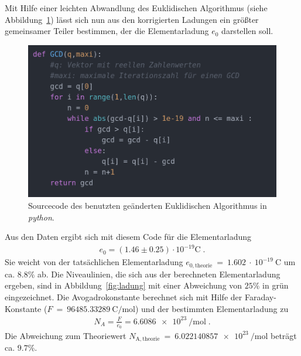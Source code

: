 Mit Hilfe einer leichten Abwandlung des Euklidischen Algorithmus (siehe Abbildung~\ref{fig:eukl}) lässt sich nun aus den korrigierten Ladungen ein größter gemeinsamer Teiler bestimmen, der die Elementarladung $e_0$ darstellen soll.

\begin{figure}
  \centering
  \includegraphics[width=0.5\textheight]{../figures/GCD.png}
  \caption{Sourcecode des benutzten geänderten Euklidischen Algorithmus in \emph{python}.}
\label{fig:eukl}
\end{figure}

Aus den Daten ergibt sich mit diesem Code für die Elementarladung
\begin{align}
  e_0 = (1.46 \pm 0.25)\cdot 10^{-19} \si{\coulomb} \; .
\end{align}
Sie weicht von der tatsächlichen Elementarladung $e_{0,\mathrm{theorie}}~=~1.602~\cdot~10^{-19}~\si{\coulomb}$  um ca. $8.8\%$ ab. Die Niveaulinien, die sich aus der berechneten Elementarladung ergeben, sind in Abbildung~\ref{fig:ladung} mit einer Abweichung von $25\%$ in grün eingezeichnet.
Die Avogadrokonstante berechnet sich mit Hilfe der Faraday-Konstante ($F~=~\SI{96485.33289}{\coulomb\per\mol}$) und der bestimmten Elementarladung zu
\begin{align}
  N_A = \frac{F}{e_0} = \SI{6.6086e+23}{\per\mol} \; .
\end{align}
Die Abweichung zum Theoriewert $N_{\mathrm{A,theorie}}~=~\SI{6.022140857e+23}{\per\mol}$ beträgt ca. $9.7\%$.


